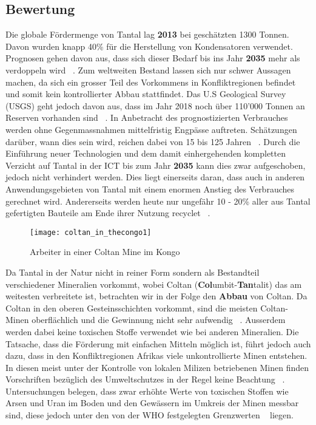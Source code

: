 \subsection{Bewertung}
Die globale Fördermenge von Tantal lag \textbf{2013} bei geschätzten 1300 Tonnen. Davon wurden
knapp 40\% für die Herstellung von Kondensatoren verwendet. Prognosen gehen
davon aus, dass sich dieser Bedarf bis ins Jahr \textbf{2035} mehr als
verdoppeln wird ~\cite{Weltweit69:online}.
Zum  weltweiten Bestand lassen sich nur schwer Aussagen machen, da sich ein grosser
Teil des Vorkommens in Konfliktregionen befindet und somit kein kontrollierter
Abbau stattfindet. Das U.S Geological Survey (USGS) geht jedoch davon aus, dass
im Jahr 2018 noch über 110'000 Tonnen an Reserven vorhanden
sind ~\cite{ober2018mineral}.
In Anbetracht des prognostizierten Verbrauches werden ohne Gegenmassnahmen
mittelfristig Engpässe auftreten. Schätzungen darüber, wann dies sein wird,
reichen dabei von 15 bis 125 Jahren ~\cite{behrendt2007seltene}. Durch die Einführung neuer Technologien und dem
damit einhergehenden kompletten Verzicht auf Tantal in der ICT bis zum Jahr \textbf{2035} kann dies
zwar aufgeschoben, jedoch nicht verhindert werden. Dies liegt einerseits daran,
dass auch in anderen Anwendungsgebieten von Tantal mit einem enormen Anstieg des
Verbrauches gerechnet wird. Andererseits werden heute nur ungefähr 10 - 20\%
aller aus Tantal gefertigten Bauteile am Ende ihrer Nutzung recyclet ~\cite{behrendt2007seltene}.

\begin{figure}[h]
\centering
\texttt{[image: coltan\_in\_thecongo1]}
\caption{Arbeiter in einer Coltan Mine im Kongo ~\cite{Coltanam17:online}}
\label{}
\end{figure}

Da Tantal in der Natur nicht in reiner Form sondern als Bestandteil verschiedener
Mineralien vorkommt, wobei Coltan (\textbf{Col}umbit-\textbf{Tan}talit) das am
weitesten verbreitete ist, betrachten wir in der Folge den \textbf{Abbau} von Coltan.
Da Coltan in den oberen Gesteinsschichten vorkommt, sind die meisten
Coltan-Minen oberflächlich und die Gewinnung nicht sehr
aufwendig ~\cite{reetsch2008effects}. Ausserdem werden dabei keine toxischen
Stoffe verwendet wie bei anderen Mineralien. Die Tatsache, dass die Förderung
mit einfachen Mitteln möglich ist, führt jedoch auch dazu, dass in den
Konfliktregionen Afrikas viele unkontrollierte Minen entstehen. In diesen meist
unter der Kontrolle von lokalen Milizen betriebenen Minen finden Vorschriften
bezüglich des Umweltschutzes in der Regel keine Beachtung ~\cite{bleischwitz2012coltan}.
Untersuchungen belegen, dass zwar erhöhte Werte von toxischen Stoffen wie Arsen
und Uran im Boden und den Gewässern im Umkreis der Minen messbar sind, diese
jedoch unter den von der WHO festgelegten Grenzwerten ~\cite{environmental_management} liegen.

